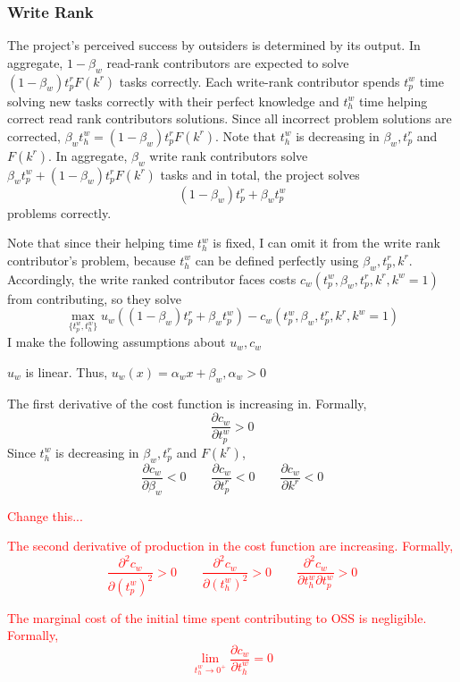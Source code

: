 \documentclass[12pt,notitlepage]{article}
\begin{document}
\subsubsection{Write Rank}
The project's perceived success by outsiders is determined by its output. In aggregate, $1-\beta_w$ read-rank contributors are expected to solve $(1-\beta_w) t_p^rF(k^r)$ tasks correctly. Each write-rank contributor spends $t_p^w$ time solving new tasks correctly with their perfect knowledge and $t_h^w$ time helping correct read rank contributors solutions. Since all incorrect problem solutions are corrected, $\beta_w t_h^w = (1-\beta_w) t_p^rF(k^r)$. Note that $t_h^w$ is decreasing in $\beta_w, t_p^r$ and $F(k^r)$. In aggregate, $\beta_w$ write rank contributors solve $\beta_w t_p^w + (1-\beta_w) t_p^rF(k^r)$ tasks and in total, the project solves
$$(1-\beta_w) t_p^r + \beta_w t_p^w $$
problems correctly.

\qquad Note that since their helping time $t_h^w$ is fixed, I can omit it from the write rank contributor's problem, because $t_h^w$ can be defined perfectly using $\beta_w, t_p^r, k^r$. Accordingly, the write ranked contributor faces costs $c_w(t_p^w, \beta_w, t_p^r, k^r, k^w = 1)$ from contributing, so they solve
$$\max_{\{t_p^w, t_h^w\}} u_w\left((1-\beta_w) t_p^r + \beta_w t_p^w \right) - c_w(t_p^w, \beta_w, t_p^r, k^r, k^w = 1)$$
I make the following assumptions about $u_w, c_w$
\begin{enumerate}
    \item $u_w$ is linear. Thus, $u_w(x) = \alpha_wx + \beta_w, \alpha_w > 0$
    \item The first derivative of the cost function is increasing in. Formally, 
    $$\frac{\partial c_w}{\partial t_p^w}>0 $$
    Since $t_h^w$ is decreasing in $\beta_w, t_p^r$ and $F(k^r)$,
    $$\frac{\partial c_w}{\partial \beta_w}<0 \qquad \frac{\partial c_w}{\partial t_p^r}<0 \qquad \frac{\partial c_w}{\partial k^r}<0$$
    \textcolor{red}{Change this...
    \item  The second derivative of production in the cost function are increasing. Formally, $$\frac{\partial^2 c_w}{\partial (t_p^w)^2}>0 \qquad  \frac{\partial^2 c_w}{\partial (t_h^w)^2}>0 \qquad  \frac{\partial^2 c_w}{\partial t_h^w \partial t_p^w}>0$$
    \item The marginal cost of the initial time spent contributing to OSS is negligible. Formally,
    $$\lim_{t_h^w \to 0^+} \frac{\partial c_w}{\partial t_h^w} = 0$$}
\end{enumerate}
\end{document}
